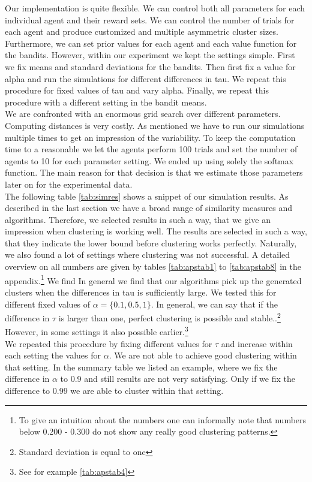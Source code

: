 \documentclass[12pt,a4paper,bibliography=totocnumbered,listof=totocnumbered]{scrartcl}
\begin{document}
Our implementation is quite flexible. We can control both all parameters for each individual agent and their reward sets. We can control the number of trials for each agent and produce customized and multiple asymmetric cluster sizes. Furthermore, we can set prior values for each agent and each value function for the bandits. However, within our experiment we kept the settings simple. First we fix means and standard deviations for the bandits. Then first fix a value for alpha and run the simulations for different differences in tau. We repeat this procedure for fixed values of tau and vary alpha. Finally, we repeat this procedure with a different setting in the bandit means.\\
We are confronted with an enormous grid search over different parameters. Computing distances is very costly. As mentioned we have to run our simulations multiple times to get an impression of the variability. To keep the computation time to a reasonable we let the agents perform 100 trials and set the number of agents to 10 for each parameter setting. We ended up using solely the softmax function. The main reason for that decision is that we estimate those parameters later on for the experimental data.\\ 
The following table \ref{tab:simres}  shows a snippet of our simulation results. As described in the last section we have a broad range of similarity measures and algorithms. Therefore, we selected results in such a way, that we give an impression when clustering is working well. The results are selected in such a way, that they indicate the lower bound before clustering works perfectly. Naturally, we also found a lot of settings where clustering was not successful. A detailed overview on all numbers are given by tables \ref{tab:apstab1} to \ref{tab:apstab8} in the appendix.\footnote{To give an intuition about the numbers one can informally note that numbers below 0.200 - 0.300 do not show any really good clustering patterns.}
We find In general we find that our algorithms pick up the generated clusters when the differences in tau is sufficiently large. We tested this for different fixed values of $\alpha=\{0.1,0.5,1\}$. In general, we can say that if the difference in $\tau$ is larger than one, perfect clustering is possible and stable..\footnote{Standard deviation is equal to one} However, in some settings it also possible earlier.\footnote{See for example \ref{tab:apstab4} } \\
We repeated this procedure by fixing different values for $\tau$ and increase within each setting the values for $\alpha$. We are not able to achieve good clustering within that setting. In the summary table we listed an example, where we fix the difference in $\alpha$ to 0.9 and  still results are not very satisfying. Only if we fix the difference to 0.99 we are able to cluster within that setting.\\
\end{document}
